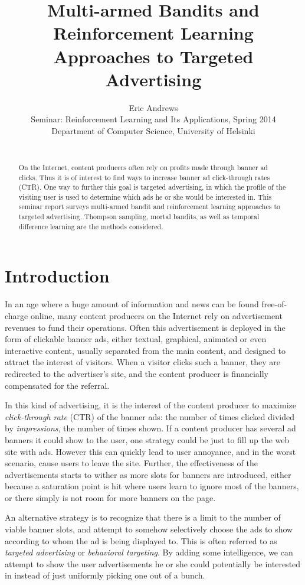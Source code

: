 \documentclass{article} %
\title{Multi-armed Bandits and Reinforcement Learning Approaches to Targeted
Advertising}
\author{
Eric Andrews \\
Seminar: Reinforcement Learning and Its Applications, Spring 2014 \\
Department of Computer Science, University of Helsinki\\\\
}
\begin{document}
\maketitle

\begin{abstract}
  On the Internet, content producers often rely on profits made through banner
  ad clicks. Thus it is of interest to find ways to increase banner ad
  click-through rates (CTR). One way to further this goal is targeted
  advertising, in which the profile of the visiting user is used to determine
  which ads he or she would be interested in. This seminar report surveys
  multi-armed bandit and reinforcement learning approaches to targeted
  advertising. Thompson sampling, mortal bandits, as well as temporal
  difference learning are the methods considered.
\end{abstract}

\section{Introduction}

In an age where a huge amount of information and news can be found
free-of-charge online, many content producers on the Internet rely on
advertisement revenues to fund their operations. Often this advertisement is
deployed in the form of clickable banner ads, either textual, graphical,
animated or even interactive content, usually separated from the main content,
and designed to attract the interest of visitors. When a visitor clicks such a
banner, they are redirected to the advertiser's site, and the content producer
is financially compensated for the referral.

In this kind of advertising, it is the interest of the content producer to
maximize \emph{click-through rate} (CTR) of the banner ads: the number of times
clicked divided by \emph{impressions}, the number of times shown. If a content
producer has several ad banners it could show to the user, one strategy could
be just to fill up the web site with ads. However this can quickly lead to user
annoyance, and in the worst scenario, cause users to leave the site. Further,
the effectiveness of the advertisements starts to wither as more slots for
banners are introduced, either because a saturation point is hit where users
learn to ignore most of the banners, or there simply is not room for more
banners on the page.

An alternative strategy is to recognize that there is a limit to the number of
viable banner slots, and attempt to somehow selectively choose the ads to show
according to whom the ad is being displayed to. This is often referred to as
\emph{targeted advertising} or \emph{behavioral targeting}. By adding some
intelligence, we can attempt to show the user advertisements he or she could
potentially be interested in instead of just uniformly picking one out of a
bunch.
\end{document}
